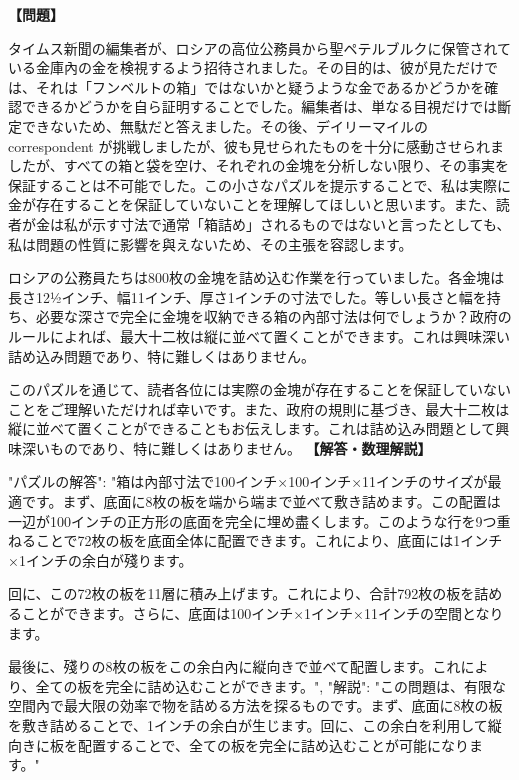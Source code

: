 \documentclass[10pt,a4paper,oneside,openany]{ltjsbook}
\begin{document}
\begin{tcolorbox}[colback=softblue,colframe=primaryblue,title=\textbf{第 371 問：GOLD PACKING IN RUSSIA.},arc=2mm,boxrule=1pt,breakable]
\textbf{【問題】}\par\vspace{0.3em}

タイムス新聞の編集者が、ロシアの高位公務員から聖ペテルブルクに保管されている金庫內の金を検視するよう招待されました。その目的は、彼が見ただけでは、それは「フンベルトの箱」ではないかと疑うような金であるかどうかを確認できるかどうかを自ら証明することでした。編集者は、単なる目視だけでは斷定できないため、無駄だと答えました。その後、デイリーマイルの correspondent が挑戦しましたが、彼も見せられたものを十分に感動させられましたが、すべての箱と袋を空け、それぞれの金塊を分析しない限り、その事実を保証することは不可能でした。この小さなパズルを提示することで、私は実際に金が存在することを保証していないことを理解してほしいと思います。また、読者が金は私が示す寸法で通常「箱詰め」されるものではないと言ったとしても、私は問題の性質に影響を與えないため、その主張を容認します。

ロシアの公務員たちは800枚の金塊を詰め込む作業を行っていました。各金塊は長さ12½インチ、幅11インチ、厚さ1インチの寸法でした。等しい長さと幅を持ち、必要な深さで完全に金塊を収納できる箱の內部寸法は何でしょうか？政府のルールによれば、最大十二枚は縦に並べて置くことができます。これは興味深い詰め込み問題であり、特に難しくはありません。

このパズルを通じて、読者各位には実際の金塊が存在することを保証していないことをご理解いただければ幸いです。また、政府の規則に基づき、最大十二枚は縦に並べて置くことができることもお伝えします。これは詰め込み問題として興味深いものであり、特に難しくはありません。
\tcblower
\textbf{【解答・数理解説】}\par\vspace{0.3em}
{
"パズルの解答": "箱は內部寸法で100インチ×100インチ×11インチのサイズが最適です。まず、底面に8枚の板を端から端まで並べて敷き詰めます。この配置は一辺が100インチの正方形の底面を完全に埋め盡くします。このような行を9つ重ねることで72枚の板を底面全体に配置できます。これにより、底面には1インチ×1インチの余白が殘ります。

回に、この72枚の板を11層に積み上げます。これにより、合計792枚の板を詰めることができます。さらに、底面は100インチ×1インチ×11インチの空間となります。

最後に、殘りの8枚の板をこの余白內に縦向きで並べて配置します。これにより、全ての板を完全に詰め込むことができます。",
"解説": "この問題は、有限な空間內で最大限の効率で物を詰める方法を探るものです。まず、底面に8枚の板を敷き詰めることで、1インチの余白が生じます。回に、この余白を利用して縦向きに板を配置することで、全ての板を完全に詰め込むことが可能になります。"
}
\end{tcolorbox}
\end{document}
